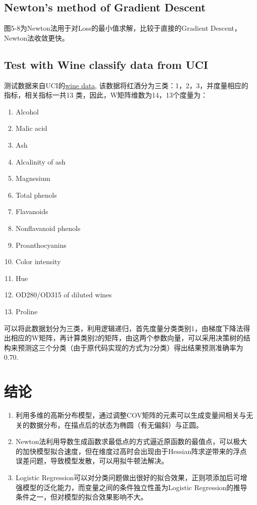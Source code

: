 \documentclass{article}
\begin{document}
\subsection{Newton's method of Gradient Descent}
图5-8为Newton法用于对Loss的最小值求解，比较于直接的Gradient Descent，Newton法收敛更快。

\subsection{Test with Wine classify data from UCI}
测试数据来自UCI的\href{https://archive.ics.uci.edu/ml/machine-learning-databases/wine}{wine data}, 该数据将红酒分为三类：1，2，3，并度量相应的指标，相关指标一共13 类，因此，W矩阵维数为14，13个度量为：
\linespread{0.5}
\begin{enumerate}
\item Alcohol
\item Malic acid
\item Ash
\item Alcalinity of ash
\item Magnesium
\item Total phenols
\item Flavanoids
\item Nonflavanoid phenols
\item Proanthocyanins
\item Color intensity
\item Hue
\item OD280/OD315 of diluted wines
\item Proline
\end{enumerate}
可以将此数据划分为三类，利用逻辑递归，首先度量分类类别1，由梯度下降法得出相应的W矩阵，再计算类别2的矩阵，由这两个参数向量，可以采用决策树的结构来预测这三个分类（由于原代码实现的方式为2分类）得出结果预测准确率为0.70.

\section{结论}
\linespread{0.5}
\begin{enumerate}
\item 利用多维的高斯分布模型，通过调整COV矩阵的元素可以生成变量间相关与无关的数据分布，在描点后的状态为椭圆（有无偏斜）与正圆。
\item Newton法利用导数生成函数求最低点的方式逼近原函数的最值点，可以极大的加快模型拟合速度，但在维度过高时会出现由于Hessian阵求逆带来的浮点误差问题，导致模型发散，可以用拟牛顿法解决。
\item Logistic Regression可以对分类问题做出很好的拟合效果，正则项添加后可增强模型的泛化能力，而变量之间的条件独立性虽为Logistic Regression的推导条件之一，但对模型的拟合效果影响不大。
\end{enumerate}
\end{document}
